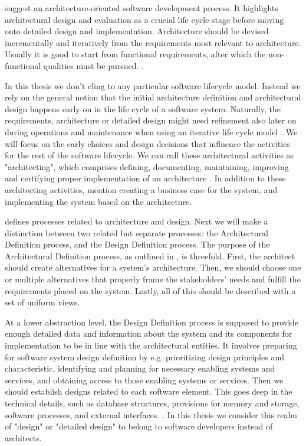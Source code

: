 \documentclass[utf8,english]{gradu3}
\begin{document}
\textcite{Koskimies2005} suggest an architecture-oriented software
development process. It highlights architectural design and evaluation as a
crucial life cycle stage before moving onto detailed design and implementation.
Architecture should be devised incrementally and iteratively from the
requirements most relevant to architecture. Usually it is good to start from
functional requirements, after which the non-functional qualities must be
pursued. \parencite{Koskimies2005}.

In this thesis we don't cling to any particular software lifecycle model.
Instead we rely on the general notion that the initial architecture definition
and architectural design happens early on in the life cycle of a software
system. Naturally, the requirements, architecture or detailed design might need
refinement also later on during operations and maintenance when using an
iterative life cycle model \parencite{IEEE12207}. We will focus on the early choices and
design decisions that influence the activities for the rest of the software
lifecycle. We can call these architectural activities as "architecting", which
comprises defining, documenting, maintaining, improving and certifying proper
implementation of an architecture \parencite[3]{IEEE42010}. In addition to these
architecting activities, \textcite[12]{Bass1998} mention creating a business case
for the system, and implementing the system based on the architecture.

\textcite{IEEE12207} defines processes related to architecture and design. Next we will
make a distinction between two related but separate processes: the Architectural
Definition process, and the Design Definition process. The purpose of the
Architectural Definition process, as outlined in \textcite[66]{IEEE12207}, is threefold.
First, the architect should create alternatives for a system's architecture.
Then, we should choose one or multiple alternatives that properly frame the
stakeholders' needs and fulfill the requirements placed on the system. Lastly,
all of this should be described with a set of uniform views.

At a lower abstraction level, the Design Definition process \parencite[71]{IEEE12207} is
supposed to provide enough detailed data and information about the system and
its components for implementation to be in line with the architectural entities.
It involves preparing for software system design definition by e.g. prioritizing
design principles and characteristic, identifying and planning for necessary
enabling systems and services, and obtaining access to those enabling systems or
services. Then we should establish designs related to each software element.
This goes deep in the technical details, such as database structures, provisions
for memory and storage, software processes, and external interfaces. \parencite[72]{IEEE12207}.
In this thesis we consider this realm of "design" or "detailed design" to
belong to software developers instead of architects.
\end{document}
